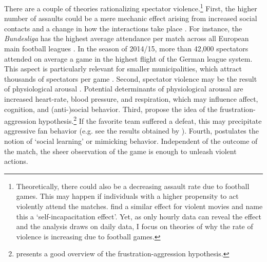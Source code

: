 There are a couple of theories rationalizing spectator violence.\footnote{Theoretically, there could also be a decreasing assault rate due to football games. This may happen if individuals with a higher propensity to act violently attend the matches. \cite{dahl2009movie} find a similar effect for violent movies and name this a `self-incapacitation effect'. Yet, as only hourly data can reveal the effect and the analysis draws on daily data, I focus on theories of why the rate of violence is increasing due to football games.} First, the higher number of assaults could be a mere mechanic effect arising from increased social contacts and a change in how the interactions take place \citep{montolio2019measuring}. For instance, the \textit{Bundesliga} has the highest average attendance per match across all European main football leagues \citep{wicker2017effect}. In the season of 2014/15, more than 42,000 spectators attended on average a game in the highest flight of the German league system. This aspect is particularly relevant for smaller municipalities, which attract thousands of spectators per game \citep{lindo2018college}. Second, spectator violence may be the result of physiological arousal \citep{branscombe1992role}. Potential determinants of physiological arousal are increased heart-rate, blood pressure, and respiration, which may influence affect, cognition, and (anti-)social behavior. Third, \cite{dollard1939frustration} propose the idea of the frustration-aggression hypothesis.\footnote{\cite{berkowitz1989frustration} presents a good overview of the frustration-aggression hypothesis.} If the favorite team suffered a defeat, this may precipitate aggressive fan behavior (e.g. see the results obtained by \cite{card2011family}). Fourth, \cite{bandura1973aggression, bandura2007social} postulates the notion of `social learning' or mimicking behavior. Independent of the outcome of the match, the sheer observation of the game is enough to unleash violent actions.



